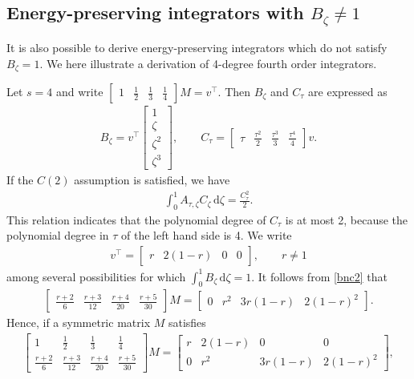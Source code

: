 \documentclass[final,leqno,onefignum,onetabnum]{siamltex1213}
\begin{document}
\subsection{Energy-preserving integrators with $B_\zeta\neq 1$}
It is also possible to derive energy-preserving integrators
which do not satisfy $B_\zeta=1$.
We here illustrate a derivation of 4-degree fourth order integrators.

Let $s=4$ and write $\displaystyle{\begin{bmatrix}
1 & \frac{1}{2} & \frac{1}{3} & \frac{1}{4}
\end{bmatrix}M = v^\top}$.
Then $B_\zeta$ and $C_\tau$ are expressed as
\begin{align*}
B_\zeta = v^\top \begin{bmatrix}
1 \\ \zeta \\ \zeta ^2 \\ \zeta ^3
\end{bmatrix},
\qquad
C_\tau = \begin{bmatrix}
\tau & \frac{\tau^2}{2} & \frac{\tau^3}{3} & \frac{\tau^4}{4}
\end{bmatrix} v.
\end{align*}
If the $C(2)$ assumption is satisfied, we have
\begin{align} \label{bnc2}
\int_0^1 A_{\tau,\zeta} C_\zeta \,{\mathrm d}\zeta = \frac{C_\tau^2}{2}.
\end{align}
This relation indicates that the polynomial degree of $C_\tau$
is at most 2, because the polynomial degree in $\tau$
of the left hand side is 4.
We write
\begin{align}
v^\top = \begin{bmatrix}
r & 2 (1-r) & 0 & 0
\end{bmatrix}, \qquad r\neq 1
\end{align}
among several possibilities for which
$\int_0^1 B_\zeta\,{\mathrm d}\zeta = 1$.
It follows from \eqref{bnc2} that
\begin{align}
\begin{bmatrix}
\frac{r+2}{6} & \frac{r+3}{12} & \frac{r+4}{20} & \frac{r+5}{30}
\end{bmatrix}
M=
\begin{bmatrix}
0 & r^2 & 3r(1-r) &2(1-r)^2
\end{bmatrix}.
\end{align}
Hence, if a symmetric matrix $M$ satisfies 
\begin{align}
\begin{bmatrix}
1 & \frac{1}{2} & \frac{1}{3} & \frac{1}{4} \\
\frac{r+2}{6} & \frac{r+3}{12} & \frac{r+4}{20} & \frac{r+5}{30}
\end{bmatrix}
M = 
\begin{bmatrix}
r & 2(1-r) & 0 & 0 \\
0 & r^2 & 3r(1-r) &2(1-r)^2
\end{bmatrix},
\end{align}
\end{document}

